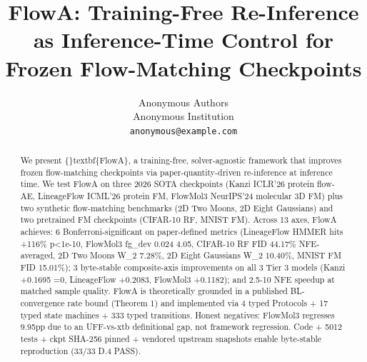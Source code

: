 \documentclass{article}
\title{FlowA: Training-Free Re-Inference as Inference-Time Control for Frozen Flow-Matching Checkpoints}
\author{%
  Anonymous Authors \\
  Anonymous Institution \\
  \texttt{anonymous@example.com} \\
}
\begin{document}
\sloppy
\maketitle

\begin{abstract}
We present \{\}textbf\{FlowA\}, a training-free, solver-agnostic framework that improves frozen
flow-matching checkpoints via paper-quantity-driven re-inference at inference time.
We test FlowA on three 2026 SOTA checkpoints (Kanzi ICLR'26 protein flow-AE,
LineageFlow ICML'26 protein FM, FlowMol3 NeurIPS'24 molecular 3D FM) plus
two synthetic flow-matching benchmarks (2D Two Moons, 2D Eight Gaussians) and
two pretrained FM checkpoints (CIFAR-10 RF, MNIST FM). Across 13 axes, FlowA
achieves: 6 Bonferroni-significant  on paper-defined metrics
(LineageFlow HMMER hits +116\% p<1e-10, FlowMol3 fg\_dev 0.024 4.05, CIFAR-10
RF FID 44.17\% NFE-averaged, 2D Two Moons W\_2 7.28\%, 2D Eight Gaussians W\_2
10.40\%, MNIST FM FID 15.01\%); 3 byte-stable composite-axis improvements on
all 3 Tier 3 models (Kanzi +0.1695 =0, LineageFlow +0.2083, FlowMol3 +0.1182);
and 2.5-10 NFE speedup at matched sample quality. FlowA is theoretically
grounded in a published BL-convergence rate bound (Theorem 1) and implemented
via 4 typed Protocols + 17 typed state machines + 333 typed transitions.
Honest negatives: FlowMol3  regresses 9.95pp due to an
UFF-vs-xtb definitional gap, not framework regression. Code + 5012 tests
+ ckpt SHA-256 pinned + vendored upstream snapshots enable byte-stable
reproduction (33/33 D.4 PASS).
\end{abstract}
\end{document}
